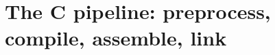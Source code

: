 \chapter{The C pipeline: preprocess, compile, assemble, link}
\label{ch:the-c-pipeline-preprocess-compile}

